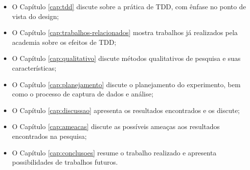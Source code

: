 \begin{itemize}
	\item O Capítulo \ref{cap:tdd} discute sobre a prática de TDD, com ênfase no
	ponto de vista do design;
  
	\item O Capítulo \ref{cap:trabalhos-relacionados} mostra trabalhos já
	realizados pela academia sobre os efeitos de TDD;

 	\item O Capítulo \ref{cap:qualitativo} discute métodos qualitativos de
 	pesquisa e suas características;

	\item O Capítulo \ref{cap:planejamento} discute o planejamento do experimento,
	bem como o processo de captura de dados e análise;

	\item O Capítulo \ref{cap:discussao} apresenta os resultados encontrados e
	os discute;
	
	\item O Capítulo \ref{cap:ameacas} discute as possíveis ameaças aos resultados
	encontrados na pesquisa;
	
	\item O Capítulo \ref{cap:conclusoes} resume o trabalho realizado e apresenta
	possibilidades de trabalhos futuros.
\end{itemize}

